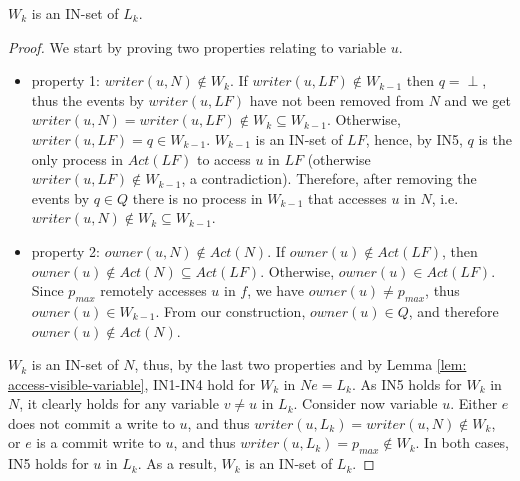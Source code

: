 \begin{claim-subsection} \label{claim: W_k-is-an-IN-set}
	$W_k$ is an IN-set of $L_k$.
\end{claim-subsection}

\begin{proof}

We start by proving two properties relating to variable $u$.

\begin{itemize}

\item property 1: $writer(u,N) \notin W_k$. If $writer(u, L F) \notin W_{k-1}$ then $q = \perp$, thus the events by $writer(u, L F)$ have not been removed from $N$ and we get $writer(u, N) = writer(u, L F) \notin W_k \subseteq W_{k-1}$. Otherwise, $writer(u, L F) = q \in W_{k-1}$. $W_{k-1}$ is an IN-set of $L F$, hence, by IN5, $q$ is the only process in $Act(L F)$ to access $u$ in $L F$ (otherwise $writer(u, L F) \notin W_{k-1}$, a contradiction). Therefore, after removing the events by $q \in Q$ there is no process in $W_{k-1}$ that accesses $u$ in $N$, i.e. $writer(u, N) \notin W_k \subseteq W_{k-1}$.
    
\item property 2: $owner(u,N) \notin Act(N)$. If $owner(u) \notin Act(L F)$, then $owner(u) \notin Act(N) \subseteq Act(L F)$. Otherwise, $owner(u) \in Act(L F)$. Since $p_{max}$ remotely accesses $u$ in $f$, we have $owner(u) \neq p_{max}$, thus  $owner(u) \in W_{k-1}$. From our construction, $owner(u) \in Q$, and therefore $owner(u) \notin Act(N)$.
    
\end{itemize}
	
	$W_k$ is an IN-set of $N$, thus, by the last two properties and by Lemma \ref{lem: access-visible-variable}, IN1-IN4 hold for $W_k$ in $N e = L_k$. As IN5 holds for $W_k$ in $N$, it clearly holds for any variable $v \neq u$ in $L_k$. Consider now variable $u$. Either $e$ does not commit a write to $u$, and thus $writer(u,L_k) = writer(u,N) \notin W_k$, or $e$ is a commit write to $u$, and thus $writer(u,L_k) = p_{max} \notin W_k$. In both cases, IN5 holds for $u$ in $L_k$. As a result, $W_k$ is an IN-set of $L_k$.
\end{proof}

